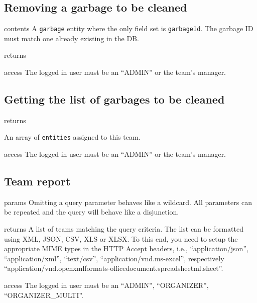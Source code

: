\subsection{Removing a garbage to be cleaned}

\begin{apidata}{contents}
    A \texttt{garbage} entity where the only field set is \texttt{garbageId}.
    The garbage ID must match one already existing in the DB.
\end{apidata}
\begin{apidata}{returns}
  \begin{datalist}
  \end{datalist}
\end{apidata}
\begin{apidata}{access}
The logged in user must be an ``ADMIN'' or the team's manager.
\end{apidata}

\subsection{Getting the list of garbages to be cleaned}

\begin{apidata}{returns}
  \begin{datalist}
    \item{An array of \texttt{entities} assigned to this team.}
  \end{datalist}
\end{apidata}
\begin{apidata}{access}
The logged in user must be an ``ADMIN'' or the team's manager.
\end{apidata}


\subsection{Team report}

\begin{apidata}{params}
  Omitting a query parameter behaves like a wildcard. All parameters can be
  repeated and the query will behave like a disjunction.
\end{apidata}
\begin{apidata}{returns}
  A list of teams matching the query criteria. The list can be formatted using
  XML, JSON, CSV, XLS or XLSX. To this end, you need to setup the appropriate
  MIME types in the HTTP Accept headers, i.e., ``application/json'',
  ``application/xml'', ``text/csv'', ``application/vnd.ms-excel'', respectively
  ``application/vnd.openxmlformats-officedocument.spreadsheetml.sheet''.
\end{apidata}
\begin{apidata}{access}
The logged in user must be an ``ADMIN'', ``ORGANIZER'', ``ORGANIZER\_MULTI''. 
\end{apidata}

